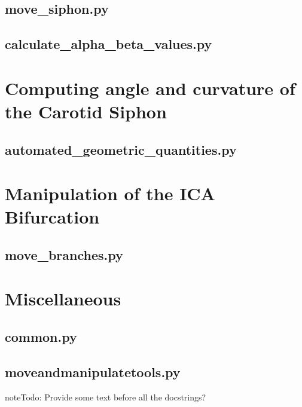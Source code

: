 \documentclass[letterpaper,10pt,english]{sphinxmanual}
\begin{document}
\subsection{move\_siphon.py}
\label{\detokenize{scripts:move-siphon-py}}

\subsection{calculate\_alpha\_beta\_values.py}
\label{\detokenize{scripts:calculate-alpha-beta-values-py}}

\section{Computing angle and curvature of the Carotid Siphon}
\label{\detokenize{scripts:computing-angle-and-curvature-of-the-carotid-siphon}}

\subsection{automated\_geometric\_quantities.py}
\label{\detokenize{scripts:automated-geometric-quantities-py}}

\section{Manipulation of the ICA Bifurcation}
\label{\detokenize{scripts:manipulation-of-the-ica-bifurcation}}

\subsection{move\_branches.py}
\label{\detokenize{scripts:move-branches-py}}

\section{Miscellaneous}
\label{\detokenize{scripts:miscellaneous}}

\subsection{common.py}
\label{\detokenize{scripts:common-py}}

\subsection{moveandmanipulatetools.py}
\label{\detokenize{scripts:moveandmanipulatetools-py}}
\begin{sphinxadmonition}{note}{\label{scripts:index-1}Todo:}
Provide some text before all the docstrings?
\end{sphinxadmonition}



\renewcommand{\indexname}{Index}
\printindex
\end{document}
